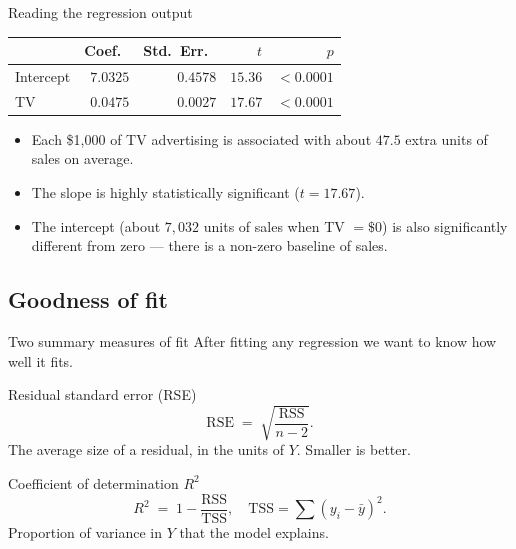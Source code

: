 \documentclass[aspectratio=169,11pt]{beamer}
\begin{document}
\begin{frame}{Reading the regression output}
  \begin{center}
  \begin{tabular}{lrrrr}
    \toprule
    & Coef.\ & Std.\ Err.\ & $t$ & $p$ \\
    \midrule
    Intercept & $7.0325$ & $0.4578$ & $15.36$ & $<0.0001$ \\
    TV        & $0.0475$ & $0.0027$ & $17.67$ & $<0.0001$ \\
    \bottomrule
  \end{tabular}
  \end{center}
  \begin{readme}
    \begin{itemize}
      \item Each \$1{,}000 of TV advertising is associated with about
            $47.5$ extra units of sales on average.
      \item The slope is highly statistically significant
            ($t = 17.67$).
      \item The intercept (about $7{,}032$ units of sales when TV $= \$0$)
            is also significantly different from zero --- there is a
            non-zero baseline of sales.
    \end{itemize}
  \end{readme}
\end{frame}


\subsection{Goodness of fit}

\begin{frame}{Two summary measures of fit}
  After fitting any regression we want to know how well it fits.
  \begin{block}{Residual standard error (RSE)}
    \[
      \mathrm{RSE} \;=\; \sqrt{\frac{\mathrm{RSS}}{n - 2}}.
    \]
    The average size of a residual, in the units of $Y$. Smaller is
    better.
  \end{block}
  \begin{block}{Coefficient of determination $R^2$}
    \[
      R^2 \;=\; 1 - \frac{\mathrm{RSS}}{\mathrm{TSS}}, \quad
      \mathrm{TSS} = \sum (y_i - \bar y)^2.
    \]
    Proportion of variance in $Y$ that the model explains.
  \end{block}
\end{frame}
\end{document}
